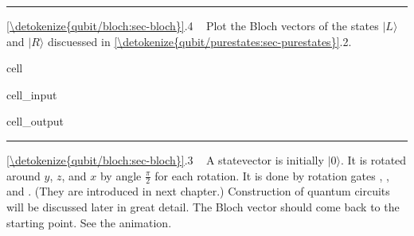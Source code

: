 \documentclass[letterpaper,10pt,english]{jupyterBook}
\begin{document}
\bigskip\hrule\bigskip


\sphinxAtStartPar
{} \hyperref[\detokenize{qubit/bloch:sec-bloch}]{\ref{\detokenize{qubit/bloch:sec-bloch}}}.4   Plot the Bloch vectors of the states \(|L\rangle\) and \(|R\rangle\) discuessed in  \hyperref[\detokenize{qubit/purestates:sec-purestates}]{\ref{\detokenize{qubit/purestates:sec-purestates}}}.2.

\begin{sphinxuseclass}{cell}\begin{sphinxVerbatimInput}

\begin{sphinxuseclass}{cell_input}
\begin{sphinxVerbatim}[commandchars=\\\{\}]
   
     
     
\end{sphinxVerbatim}

\end{sphinxuseclass}\end{sphinxVerbatimInput}
\begin{sphinxVerbatimOutput}

\begin{sphinxuseclass}{cell_output}
\noindent{}

\end{sphinxuseclass}\end{sphinxVerbatimOutput}

\end{sphinxuseclass}

\bigskip\hrule\bigskip


\sphinxAtStartPar
{} \hyperref[\detokenize{qubit/bloch:sec-bloch}]{\ref{\detokenize{qubit/bloch:sec-bloch}}}.3    A statevector is initially \(|0\rangle\).  It is rotated around \(y\), \(z\), and \(x\) by angle \(\frac{\pi}{2}\) for each rotation. It is done by rotation gates , , and . (They are introduced in next chapter.) Construction of quantum circuits will be discussed later in great detail.   The Bloch vector should come back to the starting point. See the animation.
\end{document}
